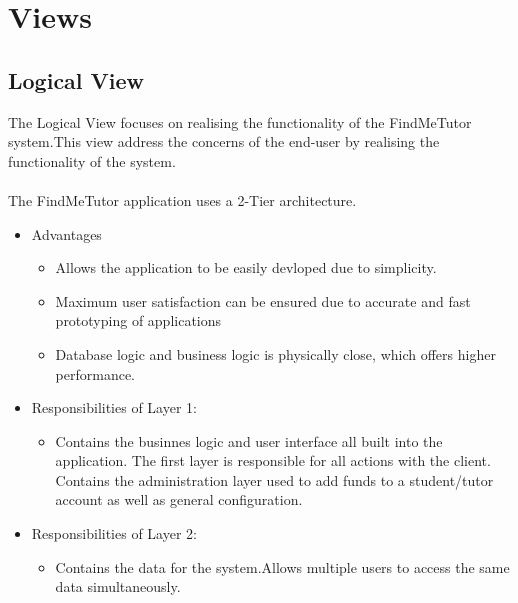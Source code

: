 \documentclass[12pt]{article}
\begin{document}
\section{Views}
\subsection{Logical View}

The Logical View focuses on realising the functionality of the FindMeTutor system.This view address the concerns of the end-user by realising the functionality of the system.\\\\
The FindMeTutor application uses a 2-Tier architecture. 
\begin{itemize}
\item Advantages
\begin{itemize}
\item Allows the application to be easily devloped due to simplicity.
\item Maximum user satisfaction can be ensured due to accurate and fast prototyping of applications
\item Database logic and business logic is physically close, which offers higher performance.\\
\end{itemize}
\item Responsibilities of Layer 1:
\begin{itemize}
\item Contains the businnes logic and user interface all built into the application. The first layer is responsible for all actions with the client. Contains the administration layer used to add funds to a student/tutor account as well as general configuration.
\end{itemize}
\item Responsibilities of Layer 2:
\begin{itemize}
\item Contains the data for the system.Allows multiple users to access the same data simultaneously.
\end{itemize}
\end{itemize}
\end{document}
